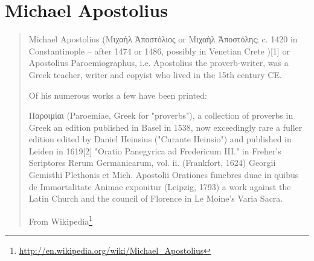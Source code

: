 \documentclass[12pt,letterpaper,twoside,final]{memoir}
\begin{document}
\section{Michael Apostolius}
\blockquote[From Wikipedia\footnote{\url{http://en.wikipedia.org/wiki/Michael_Apostolius}}]{Michael Apostolius (Μιχαὴλ Ἀποστόλιος or Μιχαὴλ Ἀποστόλης; c. 1420 in Constantinople – after 1474 or 1486, possibly in Venetian Crete )[1] or Apostolius Paroemiographus, i.e. Apostolius the proverb-writer, was a Greek teacher, writer and copyist who lived in the 15th century CE.

Of his numerous works a few have been printed:

    Παροιμίαι (Paroemiae, Greek for "proverbs"), a collection of proverbs in Greek
        an edition published in Basel in 1538, now exceedingly rare
        a fuller edition edited by Daniel Heinsius ("Curante Heinsio") and published in Leiden in 1619[2]
    "Oratio Panegyrica ad Fredericum III." in Freher's Scriptores Rerum Germanicarum, vol. ii. (Frankfort, 1624)
    Georgii Gemisthi Plethonis et Mich. Apostolii Orationes funebres duae in quibus de Immortalitate Animae exponitur (Leipzig, 1793)
    a work against the Latin Church and the council of Florence in Le Moine's Varia Sacra.}
\end{document}
